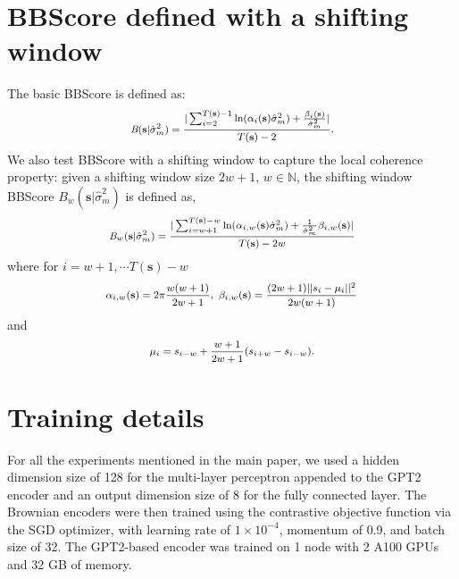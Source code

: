 \documentclass[letterpaper]{article}
\def \bb{\textit{B}}
\def \ss{\mathbf{s}}
\begin{document}
\section{BBScore defined with a shifting window}
\label{sec:app2_bb_window}
The basic BBScore is defined as:
\begin{equation}
\label{eq:evaluation_measure1}
\footnotesize
\begin{aligned}
\bb (\ss| \hat{\sigma}_m^2) = \frac{|\sum_{i=2}^{T(\ss)-1} \ln(\alpha_i(\ss) \hat{\sigma}_m^2)+ \frac{\beta_i(\ss)}{\hat{\sigma}_m^2}|}{T(\ss)-2}.
\end{aligned}
\end{equation}
We also test BBScore with a shifting window to capture the local coherence property: given a shifting window size $2w+1$, $w\in \mathbb{N}$, the shifting window BBScore $\bb_w (\ss| \hat{\sigma}_m^2)$ is defined as,
\begin{equation}
\label{eq:BBScore_shifting_windows}
\footnotesize
\begin{aligned}
\bb_w (\ss| \hat{\sigma}_m^2) = \frac{|\sum_{i=w+1}^{T(\ss)-w} \ln(\alpha_{i,w}(\ss) \hat{\sigma}_m^2)+ \frac{1}{\hat{\sigma}_m^2} \beta_{i,w}(\ss)|}{T(\ss)-2w}
\end{aligned}
\end{equation}
where for $i=w+1,\cdots T(\ss)-w$
\begin{equation*}
\footnotesize
\begin{aligned}
\alpha_{i,w}(\ss) = 2\pi \frac{w(w+1)}{2w+1}, \ \beta_{i,w}(\ss) = \frac{(2w+1)||s_i -\mu_i||^2}{ 2w(w+1)}
\end{aligned}
\end{equation*}
and
\begin{equation*}
\footnotesize
\begin{aligned}
\mu_i = s_{i-w} + \frac{w+1}{2w+1}(s_{i+w} - s_{i-w}).
\end{aligned}
\end{equation*}

\section{Training details}
\label{training_detail}
For all the experiments mentioned in the main paper, we used a hidden dimension size of 128 for the multi-layer perceptron appended to the GPT2 encoder and an output dimension size of 8 for the fully connected layer. The Brownian encoders were then trained using the contrastive objective function via the SGD optimizer, with learning rate of $1 \times 10^{-4}$, momentum of 0.9, and batch size of 32. The GPT2-based encoder was trained on 1 node with 2 A100 GPUs and 32 GB of memory.
\fontsize{9.5pt}{10.5pt}
\selectfont
\end{document}
